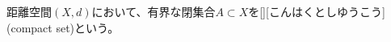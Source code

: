 \documentclass[../sotsu.tex]{subfiles}
\begin{document}





\begin{definition}
    \label{dfn:compact-set}
    距離空間$(X, d)$において、有界な閉集合$A \subset X$を[][こんはくとしゆうこう](compact set)という。
\end{definition}
\end{document}
